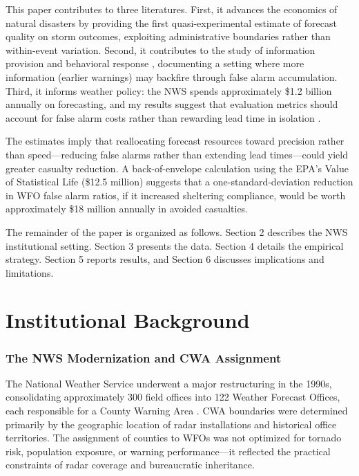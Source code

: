 \documentclass[12pt]{article}
\begin{document}
This paper contributes to three literatures. First, it advances the economics of natural disasters \citep{deryugina2017, hsiang2013, gallagher2014} by providing the first quasi-experimental estimate of forecast quality on storm outcomes, exploiting administrative boundaries rather than within-event variation. Second, it contributes to the study of information provision and behavioral response \citep{dupas2011, jensen2010}, documenting a setting where more information (earlier warnings) may backfire through false alarm accumulation. Third, it informs weather policy: the NWS spends approximately \$1.2 billion annually on forecasting, and my results suggest that evaluation metrics should account for false alarm costs rather than rewarding lead time in isolation \citep{brooks2004, nws2019}.

The estimates imply that reallocating forecast resources toward precision rather than speed---reducing false alarms rather than extending lead times---could yield greater casualty reduction. A back-of-envelope calculation using the EPA's Value of Statistical Life (\$12.5 million) suggests that a one-standard-deviation reduction in WFO false alarm ratios, if it increased sheltering compliance, would be worth approximately \$18 million annually in avoided casualties.

The remainder of the paper is organized as follows. Section 2 describes the NWS institutional setting. Section 3 presents the data. Section 4 details the empirical strategy. Section 5 reports results, and Section 6 discusses implications and limitations.


\section{Institutional Background}

\subsubsection*{The NWS Modernization and CWA Assignment} The National Weather Service underwent a major restructuring in the 1990s, consolidating approximately 300 field offices into 122 Weather Forecast Offices, each responsible for a County Warning Area \citep{uccellini2019}. CWA boundaries were determined primarily by the geographic location of radar installations and historical office territories. The assignment of counties to WFOs was not optimized for tornado risk, population exposure, or warning performance---it reflected the practical constraints of radar coverage and bureaucratic inheritance.
\end{document}
